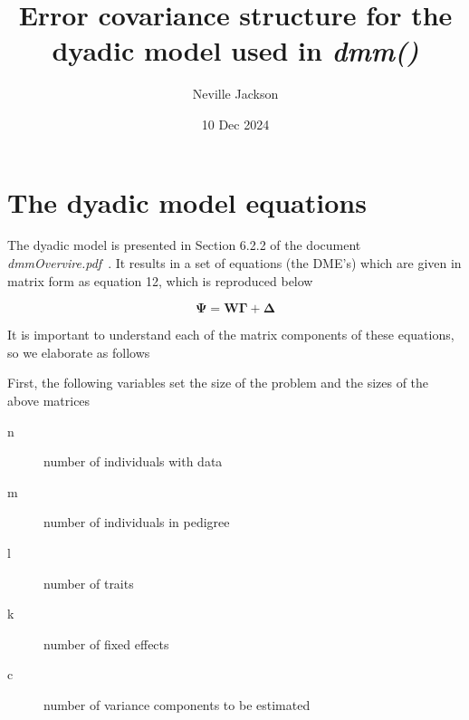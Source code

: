 \documentclass[titlepage,a4paper,12pt]{article}  %
\title{ Error covariance structure for the dyadic model used in {\em dmm()}}
\author{Neville Jackson }
\date{10 Dec 2024}
\begin{document}
 
 
\maketitle      
\tableofcontents

\section{The dyadic model equations}
The dyadic model is presented in Section 6.2.2  of the document {\em dmmOvervire.pdf}~\cite{jack:15}. It results in a set of equations (the DME's) which are given in matrix form as equation 12, which is reproduced below

\begin{equation}
\mbox{$\bm{\Psi} = \bm{W}\bm{\Gamma} + \bm{\Delta}$}   \label{eqn:dme}
\end{equation}

It is important to understand each of the matrix components of these equations, so we elaborate as follows

First, the following variables set the size of the problem and the sizes of the above matrices
\begin{description}
\item[n] number of individuals with data
\item[m] number of individuals in pedigree
\item[l] number of traits
\item[k] number of fixed effects
\item[c] number of variance components to be estimated
\end{description}
\end{document}
